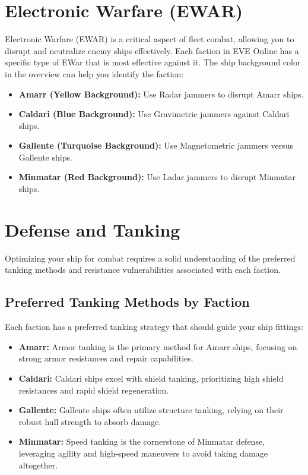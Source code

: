 \documentclass[a4paper,12pt]{report}
\begin{document}
\chapter{Electronic Warfare (EWAR)}

Electronic Warfare (EWAR) is a critical aspect of fleet combat, allowing you to disrupt and neutralize enemy ships effectively. Each faction in EVE Online has a specific type of EWar that is most effective against it. The ship background color in the overview can help you identify the faction:
\begin{itemize}
    \item \textbf{Amarr (Yellow Background):} Use Radar jammers to disrupt Amarr ships.
    \item \textbf{Caldari (Blue Background):} Use Gravimetric jammers against Caldari ships.
    \item \textbf{Gallente (Turquoise Background):} Use Magnetometric jammers versus Gallente ships.
    \item \textbf{Minmatar (Red Background):} Use Ladar jammers to disrupt Minmatar ships.
\end{itemize}

\chapter{Defense and Tanking}

Optimizing your ship for combat requires a solid understanding of the preferred tanking methods and resistance vulnerabilities associated with each faction.

\section{Preferred Tanking Methods by Faction}

Each faction has a preferred tanking strategy that should guide your ship fittings:

\begin{itemize}
    \item \textbf{Amarr:} Armor tanking is the primary method for Amarr ships, focusing on strong armor resistances and repair capabilities.
    \item \textbf{Caldari:} Caldari ships excel with shield tanking, prioritizing high shield resistances and rapid shield regeneration.
    \item \textbf{Gallente:} Gallente ships often utilize structure tanking, relying on their robust hull strength to absorb damage.
    \item \textbf{Minmatar:} Speed tanking is the cornerstone of Minmatar defense, leveraging agility and high-speed maneuvers to avoid taking damage altogether.
\end{itemize}
\end{document}
